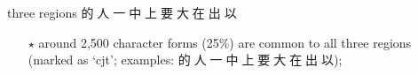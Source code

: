 
three regions {\cn{}的人一中上要大在出以}\mktsShowpar\par
\begin{itemize}\item[$\star$] around 2,500 character forms (25\%) are common to all three regions (marked as ‘cjt’; examples: {\cn{}的人一中上要大在出以});\mktsShowpar\par

\end{itemize}
